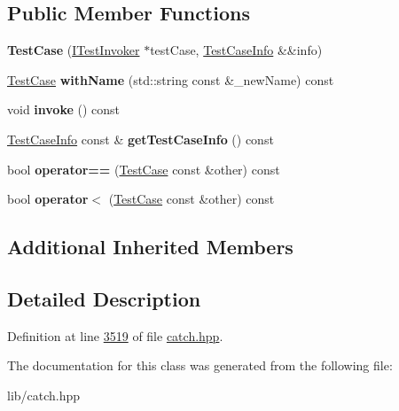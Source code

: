 \subsection*{Public Member Functions}
\begin{DoxyCompactItemize}
\item 
\mbox{\label{classCatch_1_1TestCase_aae5709fc1cb68e19ab0ac27e1ffd6a76}} 
{\bfseries Test\+Case} (\mbox{\hyperlink{structCatch_1_1ITestInvoker}{I\+Test\+Invoker}} $\ast$test\+Case, \mbox{\hyperlink{structCatch_1_1TestCaseInfo}{Test\+Case\+Info}} \&\&info)
\item 
\mbox{\label{classCatch_1_1TestCase_a0812e8a216d09b087d5874687009f0d6}} 
\mbox{\hyperlink{classCatch_1_1TestCase}{Test\+Case}} {\bfseries with\+Name} (std\+::string const \&\+\_\+new\+Name) const
\item 
\mbox{\label{classCatch_1_1TestCase_a26f346c8446dded0562fe3818ae71651}} 
void {\bfseries invoke} () const
\item 
\mbox{\label{classCatch_1_1TestCase_a1ea0d79f49156cebea076fe1ba50d2b6}} 
\mbox{\hyperlink{structCatch_1_1TestCaseInfo}{Test\+Case\+Info}} const  \& {\bfseries get\+Test\+Case\+Info} () const
\item 
\mbox{\label{classCatch_1_1TestCase_a5456d03a90f75292835c158f3a3374a1}} 
bool {\bfseries operator==} (\mbox{\hyperlink{classCatch_1_1TestCase}{Test\+Case}} const \&other) const
\item 
\mbox{\label{classCatch_1_1TestCase_a030e4b9282e9b32e08c8bd5e5cd6fa98}} 
bool {\bfseries operator$<$} (\mbox{\hyperlink{classCatch_1_1TestCase}{Test\+Case}} const \&other) const
\end{DoxyCompactItemize}
\subsection*{Additional Inherited Members}


\subsection{Detailed Description}


Definition at line \mbox{\hyperlink{catch_8hpp_source_l03519}{3519}} of file \mbox{\hyperlink{catch_8hpp_source}{catch.\+hpp}}.



The documentation for this class was generated from the following file\+:\begin{DoxyCompactItemize}
\item 
lib/catch.\+hpp\end{DoxyCompactItemize}
